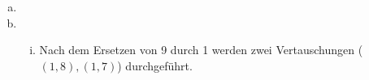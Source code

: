 \documentclass[a4paper]{scrartcl}
\begin{document}
\begin{enumerate}[(a)]
    \item

    \item 
        \begin{enumerate}[(i)]
            \item
                Nach dem Ersetzen von 9 durch 1 werden zwei Vertauschungen
                ($(1,8), (1,7)$) durchgeführt. 


\end{enumerate}
\end{enumerate}
\end{document}
